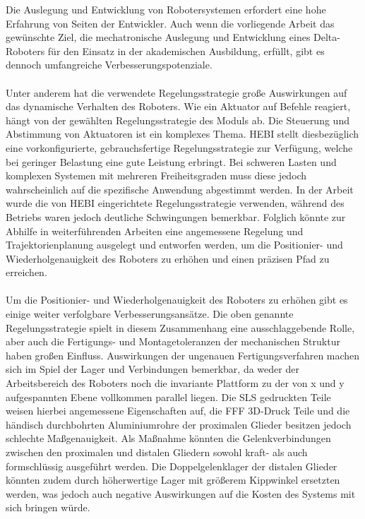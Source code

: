 \documentclass[Bachelor, BMR, ngerman]{twbook}
\begin{document}
    Die Auslegung und Entwicklung von Robotersystemen erfordert eine hohe Erfahrung von Seiten der Entwickler. Auch wenn die vorliegende Arbeit das gewünschte Ziel, die mechatronische Auslegung und Entwicklung eines Delta-Roboters für den Einsatz in der akademischen Ausbildung, erfüllt, gibt es dennoch umfangreiche Verbesserungspotenziale.\\
    \\
    Unter anderem hat die verwendete Regelungsstrategie große Auswirkungen auf das dynamische Verhalten des Roboters. Wie ein Aktuator auf Befehle reagiert, hängt von der gewählten Regelungsstrategie des Moduls ab. Die Steuerung und Abstimmung von Aktuatoren ist ein komplexes Thema. HEBI stellt diesbezüglich eine vorkonfigurierte, gebrauchsfertige Regelungsstrategie zur Verfügung, welche bei geringer Belastung eine gute Leistung erbringt. Bei schweren Lasten und komplexen Systemen mit mehreren Freiheitsgraden muss diese jedoch wahrscheinlich auf die spezifische Anwendung abgestimmt werden. In der Arbeit wurde die von HEBI eingerichtete Regelungsstrategie verwenden, während des Betriebs waren jedoch deutliche Schwingungen bemerkbar. Folglich könnte zur Abhilfe in weiterführenden Arbeiten eine angemessene Regelung und Trajektorienplanung ausgelegt und entworfen werden, um die Positionier- und Wiederholgenauigkeit des Roboters zu erhöhen und einen präzisen Pfad zu erreichen.\\
    \\
    Um die Positionier- und Wiederholgenauigkeit des Roboters zu erhöhen gibt es einige weiter verfolgbare Verbesserungsansätze. Die oben genannte Regelungsstrategie spielt in diesem Zusammenhang eine ausschlaggebende Rolle, aber auch die Fertigungs- und Montagetoleranzen der mechanischen Struktur haben großen Einfluss. Auswirkungen der ungenauen Fertigungsverfahren machen sich im Spiel der Lager und Verbindungen bemerkbar, da weder der Arbeitsbereich des Roboters noch die invariante Plattform zu der von x und y aufgespannten Ebene vollkommen parallel liegen. Die SLS gedruckten Teile weisen hierbei angemessene Eigenschaften auf, die FFF 3D-Druck Teile und die händisch durchbohrten Aluminiumrohre der proximalen Glieder besitzen jedoch schlechte Maßgenauigkeit. Als Maßnahme könnten die Gelenkverbindungen zwischen den proximalen und distalen Gliedern sowohl kraft- als auch formschlüssig ausgeführt werden. Die Doppelgelenklager der distalen Glieder könnten zudem durch höherwertige Lager mit größerem Kippwinkel ersetzten werden, was jedoch auch negative Auswirkungen auf die Kosten des Systems mit sich bringen würde.\\ 
\end{document}

